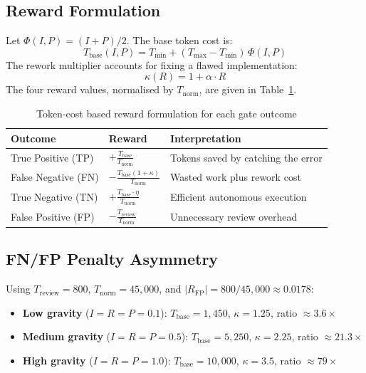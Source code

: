 \documentclass[conference]{IEEEtran}
\newcommand{\Tbase}{T_{\mathrm{base}}}
\newcommand{\Treview}{T_{\mathrm{review}}}
\newcommand{\Tnorm}{T_{\mathrm{norm}}}
\newcommand{\Tmin}{T_{\mathrm{min}}}
\newcommand{\Tmax}{T_{\mathrm{max}}}
\begin{document}
\subsection{Reward Formulation}

Let $\Phi(I,P) = (I+P)/2$.
The base token cost is:
\begin{equation}
  \label{eq:tbase}
  \Tbase(I,P) = \Tmin + (\Tmax - \Tmin)\,\Phi(I,P)
\end{equation}
The rework multiplier accounts for fixing a flawed implementation:
\begin{equation}
  \label{eq:kappa}
  \kappa(R) = 1 + \alpha \cdot R
\end{equation}
The four reward values, normalised by $\Tnorm$, are given in
Table~\ref{tab:rewards}.

\begin{table}[!t]
  \caption{Token-cost based reward formulation for each gate outcome}
  \label{tab:rewards}
  \renewcommand{\arraystretch}{1.3}
  \begin{tabularx}{\columnwidth}{@{}lXp{2.2cm}@{}}
    \toprule
    \textbf{Outcome} & \textbf{Reward} & \textbf{Interpretation} \\
    \midrule
    True Positive (TP) &
      $\displaystyle+\frac{\Tbase}{\Tnorm}$ &
      Tokens saved by catching the error \\[6pt]
    False Negative (FN) &
      $\displaystyle-\frac{\Tbase(1+\kappa)}{\Tnorm}$ &
      Wasted work plus rework cost \\[6pt]
    True Negative (TN) &
      $\displaystyle+\frac{\Tbase\cdot\eta}{\Tnorm}$ &
      Efficient autonomous execution \\[6pt]
    False Positive (FP) &
      $\displaystyle-\frac{\Treview}{\Tnorm}$ &
      Unnecessary review overhead \\
    \bottomrule
  \end{tabularx}
\end{table}

\subsection{FN/FP Penalty Asymmetry}\label{subsec:asymmetry}

Using $\Treview{=}800$, $\Tnorm{=}45{,}000$, and
$|R_{\mathrm{FP}}| = 800/45{,}000 \approx 0.0178$:

\begin{itemize}
  \item \textbf{Low gravity} ($I{=}R{=}P{=}0.1$):
        $\Tbase{=}1{,}450$, $\kappa{=}1.25$,
        ratio $\approx 3.6\times$
  \item \textbf{Medium gravity} ($I{=}R{=}P{=}0.5$):
        $\Tbase{=}5{,}250$, $\kappa{=}2.25$,
        ratio $\approx 21.3\times$
  \item \textbf{High gravity} ($I{=}R{=}P{=}1.0$):
        $\Tbase{=}10{,}000$, $\kappa{=}3.5$,
        ratio $\approx 79\times$
\end{itemize}
\end{document}
